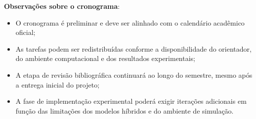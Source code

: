 \documentclass[
    12pt,
    openright,
    oneside,
    a4paper,
    english,
    brazil
]{abntex2}
\begin{document}
\textbf{Observações sobre o cronograma}: 
\begin{itemize}
    \item O cronograma é preliminar e deve ser alinhado com o calendário acadêmico oficial;
    \item As tarefas podem ser redistribuídas conforme a disponibilidade do orientador, do ambiente computacional e dos resultados experimentais;
    \item A etapa de revisão bibliográfica continuará ao longo do semestre, mesmo após a entrega inicial do projeto;
    \item A fase de implementação experimental poderá exigir iterações adicionais em função das limitações dos modelos híbridos e do ambiente de simulação.
\end{itemize}

\postextual

\end{document}
